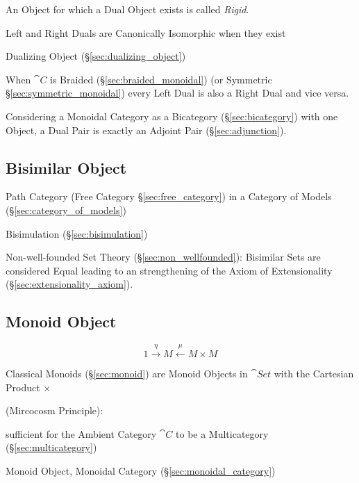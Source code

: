 An Object for which a Dual Object exists is called \emph{Rigid}.

Left and Right Duals are Canonically Isomorphic when they exist

Dualizing Object (\S\ref{sec:dualizing_object})

When $\cat{C}$ is Braided (\S\ref{sec:braided_monoidal}) (or Symmetric
\S\ref{sec:symmetric_monoidal}) every Left Dual is also a Right Dual
and vice versa.

Considering a Monoidal Category as a Bicategory
(\S\ref{sec:bicategory}) with one Object, a Dual Pair is exactly an
Adjoint Pair (\S\ref{sec:adjunction}).



\subsection{Bisimilar Object}\label{sec:bisimilar_object}

Path Category (Free Category \S\ref{sec:free_category}) in a Category
of Models (\S\ref{sec:category_of_models})

Bisimulation (\S\ref{sec:bisimulation})

Non-well-founded Set Theory (\S\ref{sec:non_wellfounded}): Bisimilar
Sets are considered Equal leading to an strengthening of the Axiom of
Extensionality (\S\ref{sec:extensionality_axiom}).



\subsection{Monoid Object}\label{sec:monoid_object}

\[
  1 \xrightarrow{\eta} M \xleftarrow{\mu} M \times M
\]

Classical Monoids (\S\ref{sec:monoid}) are Monoid Objects in
$\cat{Set}$ with the Cartesian Product $\times$

(Mircocosm Principle): %

sufficient for the Ambient Category $\cat{C}$ to be a Multicategory
(\S\ref{sec:multicategory})

Monoid Object, Monoidal Category (\S\ref{sec:monoidal_category})


